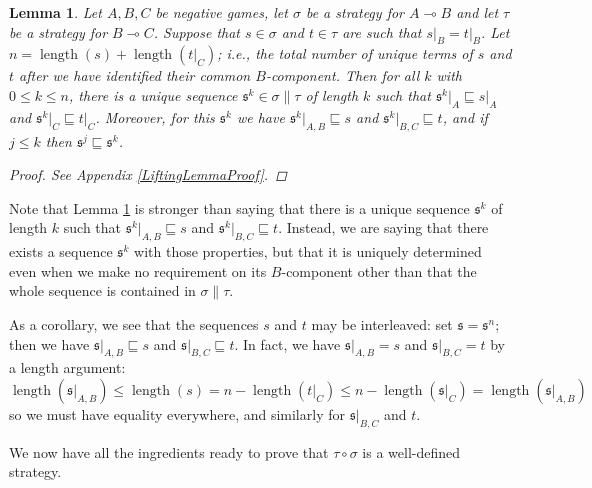 \documentclass[11pt]{article} %
\theoremstyle{plain} %
\newtheorem{lemma}[theorem]{Lemma}
\theoremstyle{definition} %
\theoremstyle{note}
\theoremstyle{exercisestyle}
\renewcommand{\implies}{\multimap}
\newcommand{\comp}[2]{#1 \circ #2}
\newcommand{\s}{\mathfrak s}
\newcommand{\prefix}{\sqsubseteq}
\DeclareMathOperator{\length}{length}
\begin{document}
\begin{lemma}
  \label{LiftingLemma}
  Let $A,B,C$ be negative games, let $\sigma$ be a strategy for $A\implies B$ and let $\tau$ be a strategy for $B\implies C$.  Suppose that $s\in\sigma$ and $t\in\tau$ are such that $s\vert_B=t\vert_B$.  Let $n=\length(s)+\length(t\vert_C)$; i.e., the total number of unique terms of $s$ and $t$ after we have identified their common $B$-component.  Then for all $k$ with $0\le k\le n$, there is a unique sequence $\s^k\in\sigma\|\tau$ of length $k$ such that $\s^k\vert_A\prefix s\vert_A$ and $\s^k\vert_C\prefix t\vert_C$.  Moreover, for this $\s^k$ we have $\s^k\vert_{A,B}\prefix s$ and $\s^k\vert_{B,C}\prefix t$, and if $j\le k$ then $\s^j\prefix \s^k$.  
  \begin{proof}
    See Appendix \ref{LiftingLemmaProof}.
  \end{proof}
\end{lemma}

Note that Lemma \ref{LiftingLemma} is stronger than saying that there is a unique sequence $\s^k$ of length $k$ such that $\s^k\vert_{A,B}\prefix s$ and $\s^k\vert_{B,C}\prefix t$.  Instead, we are saying that there exists a sequence $\s^k$ with those properties, but that it is uniquely determined even when we make no requirement on its $B$-component other than that the whole sequence is contained in $\sigma\|\tau$.

As a corollary, we see that the sequences $s$ and $t$ may be interleaved: set $\s=\s^n$; then we have $\s\vert_{A,B}\prefix s$ and $\s\vert_{B,C}\prefix t$.  In fact, we have $\s\vert_{A,B}=s$ and $\s\vert_{B,C}=t$ by a length argument:
\[
  \length(\s\vert_{A,B})\le\length(s)=n-\length(t\vert_C)\le n-\length(\s\vert_C)=\length(\s\vert_{A,B})
  \]
so we must have equality everywhere, and similarly for $\s\vert_{B,C}$ and $t$.

We now have all the ingredients ready to prove that $\comp\tau\sigma$ is a well-defined strategy.
\end{document}
